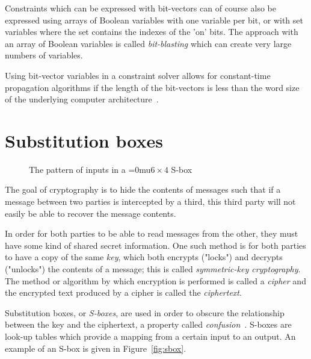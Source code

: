 \documentclass[a4paper,10pt,twoside,openright]{book}
\renewcommand{\sc}[1]{\textsc{\lowercase{#1}}}
\newcommand*\sixbyfour{\begingroup\medmuskip=0mu\relax$6 \times 4$\endgroup}
\begin{document}
Constraints which can be expressed with bit-vectors can of course also be expressed using arrays of Boolean variables with one variable per bit, or with set variables where the set contains the indexes of the 'on' bits. The approach with an array of Boolean variables is called \textit{bit-blasting} which can create very large numbers of variables. 

Using bit-vector variables in a constraint solver allows for constant-time propagation algorithms if the length of the bit-vectors is less than the word size of the underlying computer architecture~\cite{bitvectors}.

\section{Substitution boxes}
\begin{figure*}
        \centering
        \setlength{\tabcolsep}{2pt}
        \footnotesize
        
        \caption[\sc{DES}'s $S_4$ S-box]{\sc{DES}'s \sixbyfour{} S-box $S_4$. Highlighted is the row and column for the input pattern $110000$. The output for this pattern is $1111$.}
        \label{fig:sbox}
\end{figure*}
\begin{figure}
    \centering
    
    \caption{The pattern of inputs in a \sixbyfour{} S-box}
    \label{fig:bitpattern}
\end{figure}
The goal of cryptography is to hide the contents of messages such that if a message between two parties is intercepted by a third, this third party will not easily be able to recover the message contents.

In order for both parties to be able to read messages from the other, they must have some kind of shared secret information. One such method is for both parties to have a copy of the same \textit{key}, which both encrypts ("locks") and decrypts ("unlocks") the contents of a message; this is called \textit{symmetric-key cryptography}. The method or algorithm by which encryption is performed is called a \textit{cipher} and the encrypted text produced by a cipher is called the \textit{ciphertext}.

Substitution boxes, or \textit{S-boxes}, are used in order to obscure the relationship between the key and the ciphertext, a property called \textit{confusion}~\cite{shannon}. S-boxes are look-up tables which provide a mapping from a certain input to an output. An example of an S-box is given in Figure~\ref{fig:sbox}. 
\end{document}
